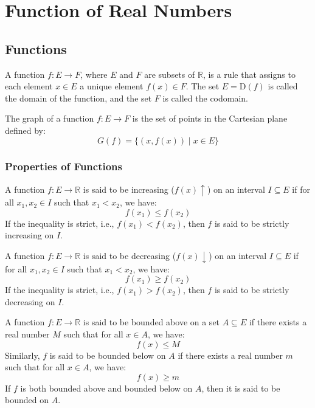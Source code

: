 \chapter{Function of Real Numbers}

\section{Functions}
\begin{definition}
    A function $f : E \to F$, where $E$ and $F$ are subsets of $\mathbb{R}$, is a rule that assigns to each element $x \in E$ a unique element $f(x) \in F$. The set $E = \text{D}(f)$ is called the domain of the function, and the set $F$ is called the codomain.
\end{definition}

\begin{definition}
    The graph of a function $f : E \to F$ is the set of points in the Cartesian plane defined by:
    \[
        G(f) = \{(x, f(x)) \mid x \in E\}
    \]
\end{definition}

\subsection{Properties of Functions}
\begin{definition}
    A function $f : E \to \mathbb{R}$ is said to be increasing ($f(x) \uparrow$) on an interval $I \subseteq E$ if for all $x_1, x_2 \in I$ such that $x_1 < x_2$, we have:
    \[
        f(x_1) \leq f(x_2)
    \]
    If the inequality is strict, i.e., $f(x_1) < f(x_2)$, then $f$ is said to be strictly increasing on $I$.
\end{definition}

\begin{definition}
    A function $f : E \to \mathbb{R}$ is said to be decreasing ($f(x) \downarrow$) on an interval $I \subseteq E$ if for all $x_1, x_2 \in I$ such that $x_1 < x_2$, we have:
    \[
        f(x_1) \geq f(x_2)
    \]
    If the inequality is strict, i.e., $f(x_1) > f(x_2)$, then $f$ is said to be strictly decreasing on $I$.
\end{definition}

\begin{definition}
    A function $f : E \to \mathbb{R}$ is said to be bounded above on a set $A \subseteq E$ if there exists a real number $M$ such that for all $x \in A$, we have:
    \[
        f(x) \leq M
    \]
    Similarly, $f$ is said to be bounded below on $A$ if there exists a real number $m$ such that for all $x \in A$, we have:
    \[
        f(x) \geq m
    \]
    If $f$ is both bounded above and bounded below on $A$, then it is said to be bounded on $A$.
\end{definition}

